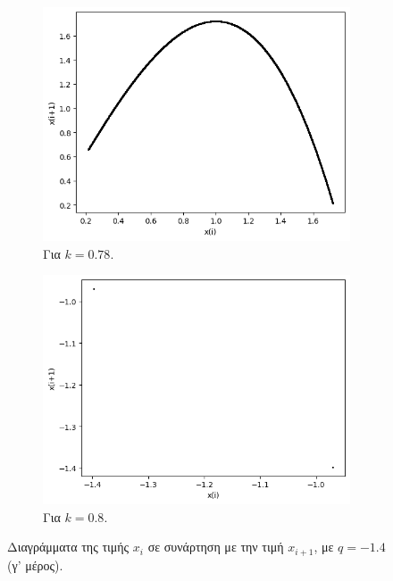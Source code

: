 \begin{figure}[ht]
	\centering
	\begin{subfigure}[b]{0.4\textwidth}
		\centering
		\includegraphics[width=\textwidth]{LateX images/graphs q14/g25}
		\caption{Για $k=0.78$.}
		\label{f:k81}
	\end{subfigure}
	\hfill
	\begin{subfigure}[b]{0.4\textwidth}
		\centering
		\includegraphics[width=\textwidth]{LateX images/graphs q14/g26}
		\caption{Για $k=0.8$.}
		\label{f:k82}
	\end{subfigure}
	\hfill	
	\caption{Διαγράμματα της τιμής \(x_i\) σε συνάρτηση με την τιμή \(x_{i+1}\), με $q=-1.4$ (γ' μέρος).}	
\end{figure}

